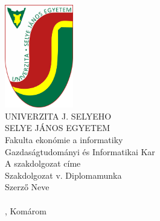 \documentclass[a4paper,oneside,onecolumn,12pt]{LegrandOrangeBook}
\begin{document}
\thispagestyle{empty}
\begin{minipage}[c][\textheight][c]{\textwidth}
    {
        \centering
        \includegraphics[keepaspectratio,width=3cm]{SelyeBanner.png} \\
        \vskip0.5cm
        {\LARGE UNIVERZITA J. SELYEHO} \\
        \vskip0.5cm
        {\LARGE SELYE JÁNOS EGYETEM} \\
        \vskip0.5cm
        {\large Fakulta ekonómie a informatiky} \\
        \vskip0.5cm
        {\large Gazdaságtudományi és Informatikai Kar} \\
        \vfill
        {\Huge A szakdolgozat címe} \\
        Szakdolgozat v. Diplomamunka \\
        Szerző Neve \\
        \ISBN \\
        \hfill\the\year{}, Komárom\hfill
    }
\end{minipage}
\cleardoublepage
\end{document}
